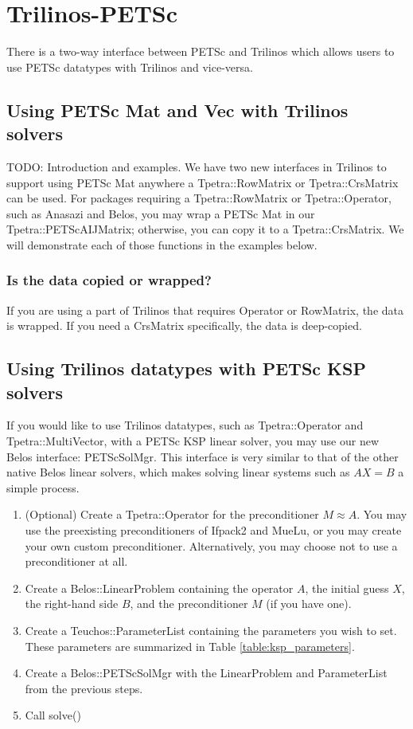 \section{Trilinos-PETSc}
There is a two-way interface between PETSc and Trilinos which allows users to
use PETSc datatypes with Trilinos and vice-versa.

\subsection{Using PETSc Mat and Vec with Trilinos solvers}
{\color{red}TODO: Introduction and examples.}
We have two new interfaces in Trilinos to support using PETSc Mat anywhere a
Tpetra::RowMatrix or Tpetra::CrsMatrix can be used.  For packages requiring a
Tpetra::RowMatrix or Tpetra::Operator, such as Anasazi and Belos, you may wrap a
PETSc Mat in our Tpetra::PETScAIJMatrix; otherwise, you can copy it to a
Tpetra::CrsMatrix.  We will demonstrate each of those functions in the examples
below.



\subsubsection{Is the data copied or wrapped?}
If you are using a part of Trilinos that requires Operator or RowMatrix, the
data is wrapped.  If you need a CrsMatrix specifically, the data is deep-copied.

\subsection{Using Trilinos datatypes with PETSc KSP solvers}
If you would like to use Trilinos datatypes, such as Tpetra::Operator and
Tpetra::MultiVector, with a PETSc KSP linear solver, you may use our new Belos
interface: PETScSolMgr.  This interface is very similar to that of the other
native Belos linear solvers, which makes solving linear systems such as $AX=B$ a
simple process. 

\begin{enumerate}
  \item (Optional) Create a Tpetra::Operator for the preconditioner $M \approx
  A$.  You may use the preexisting preconditioners of Ifpack2 and MueLu, or you
  may create your own custom preconditioner.  Alternatively, you may choose not
  to use a preconditioner at all.
  \item Create a Belos::LinearProblem containing the operator $A$, the initial
  guess $X$, the right-hand side $B$, and the preconditioner $M$ (if you have
  one).
  \item Create a Teuchos::ParameterList containing the parameters you wish to
  set.  These parameters are summarized in Table \ref{table:ksp_parameters}.
  \item Create a Belos::PETScSolMgr with the LinearProblem and ParameterList
  from the previous steps.
  \item Call solve()
\end{enumerate}

